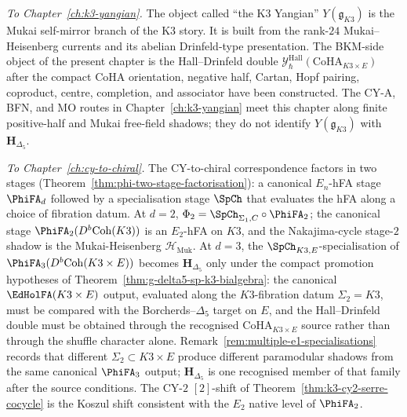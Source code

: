 \emph{To Chapter~\ref{ch:k3-yangian}.} The object called ``the K3 Yangian''
\(Y(\mathfrak{g}_{K3})\) is the Mukai self-mirror branch of the K3
story. It is built from the rank-$24$ Mukai--Heisenberg currents and its
abelian Drinfeld-type presentation. The BKM-side object of the present
chapter is the Hall--Drinfeld double
\(\mathcal{Y}^{\mathrm{Hall}}_\hbar(\mathrm{CoHA}_{K3\times E})\) after
the compact CoHA orientation, negative half, Cartan, Hopf pairing,
coproduct, centre, completion, and associator have been constructed.
The CY-A, BFN, and MO routes in Chapter~\ref{ch:k3-yangian} meet this
chapter along finite positive-half and Mukai free-field shadows; they
do not identify \(Y(\mathfrak{g}_{K3})\) with
\(\mathbf H_{\Delta_5}\).

\emph{To Chapter~\ref{ch:cy-to-chiral}.} The CY-to-chiral correspondence
factors in two stages (Theorem~\ref{thm:phi-two-stage-factorisation}): a
canonical $E_n$-hFA stage $\PhiFA_d$ followed by a specialisation stage
$\SpCh$ that evaluates the hFA along a choice of fibration datum. At
$d=2$, $\Phi_2 = \SpCh_{\Sigma_1,C}\circ\PhiFA_2$; the canonical stage
$\PhiFA_2(D^b\mathrm{Coh}(K3))$ is an $E_2$-hFA on $K3$, and the
Nakajima-cycle stage-$2$ shadow is the Mukai-Heisenberg
$\mathcal{H}_{\mathrm{Muk}}$. At $d=3$, the
$\SpCh_{K3,E}$-specialisation of
$\PhiFA_3(D^b\mathrm{Coh}(K3\times E))$ becomes
$\mathbf{H}_{\Delta_5}$ only under the compact promotion hypotheses of
Theorem~\ref{thm:g-delta5-sp-k3-bialgebra}: the canonical
$\EdHolFA(K3\times E)$ output, evaluated along the $K3$-fibration datum
$\Sigma_2 = K3$, must be compared with the Borcherds--$\Delta_5$ target
on $E$, and the Hall--Drinfeld double must be obtained through the
recognised $\mathrm{CoHA}_{K3\times E}$ source rather than through the
shuffle character alone.
Remark~\ref{rem:multiple-e1-specialisations} records that different
$\Sigma_2\subset K3\times E$ produce different paramodular shadows from
the same canonical $\PhiFA_3$ output; $\mathbf{H}_{\Delta_5}$ is one
recognised member of that family after the source conditions. The CY-$2$ $[2]$-shift of
Theorem~\ref{thm:k3-cy2-serre-cocycle} is the Koszul shift consistent
with the $E_2$ native level of $\PhiFA_2$.

